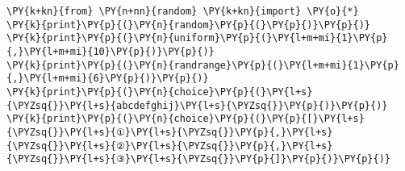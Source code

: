 \begin{Verbatim}[commandchars=\\\{\}]
\PY{k+kn}{from} \PY{n+nn}{random} \PY{k+kn}{import} \PY{o}{*}
\PY{k}{print}\PY{p}{(}\PY{n}{random}\PY{p}{(}\PY{p}{)}\PY{p}{)}
\PY{k}{print}\PY{p}{(}\PY{n}{uniform}\PY{p}{(}\PY{l+m+mi}{1}\PY{p}{,}\PY{l+m+mi}{10}\PY{p}{)}\PY{p}{)}
\PY{k}{print}\PY{p}{(}\PY{n}{randrange}\PY{p}{(}\PY{l+m+mi}{1}\PY{p}{,}\PY{l+m+mi}{6}\PY{p}{)}\PY{p}{)}
\PY{k}{print}\PY{p}{(}\PY{n}{choice}\PY{p}{(}\PY{l+s}{\PYZsq{}}\PY{l+s}{abcdefghij}\PY{l+s}{\PYZsq{}}\PY{p}{)}\PY{p}{)}
\PY{k}{print}\PY{p}{(}\PY{n}{choice}\PY{p}{(}\PY{p}{[}\PY{l+s}{\PYZsq{}}\PY{l+s}{①}\PY{l+s}{\PYZsq{}}\PY{p}{,}\PY{l+s}{\PYZsq{}}\PY{l+s}{②}\PY{l+s}{\PYZsq{}}\PY{p}{,}\PY{l+s}{\PYZsq{}}\PY{l+s}{③}\PY{l+s}{\PYZsq{}}\PY{p}{]}\PY{p}{)}\PY{p}{)}
\end{Verbatim}
